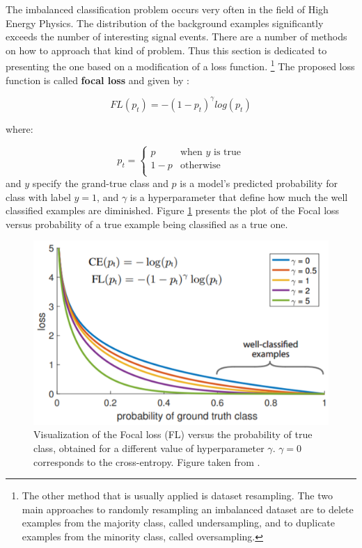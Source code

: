 The imbalanced classification problem occurs very often in the field of High Energy Physics. The distribution of the background examples significantly exceeds the number of interesting signal events. There are a number of methods on how to approach that kind of problem. Thus this section is dedicated to presenting the one based on a modification of a loss function. \footnote{The other method that is usually applied is dataset resampling.  The two main approaches to randomly resampling an imbalanced dataset are to delete examples from the majority class, called undersampling, and to duplicate examples from the minority class, called oversampling.}  The proposed loss function is called \textbf{focal loss} and given by \cite{focal_loss}: 

\begin{equation}
FL(p_t) = -(1-p_t)^{\gamma}log(p_t)
\end{equation}

where:

\begin{equation}
    p_t = \left\{ \begin{array}{ll}
p & \textrm{when $y$ is true}\\
1-p & \textrm{otherwise}\\
\end{array} \right.
\end{equation}
and $y$ specify the grand-true class and $p$ is a model's predicted probability for class with label $y=1$, and $\gamma$ is a hyperparameter that define how much the well classified examples are diminished.  Figure \ref{fig:Focal loss} presents the plot of the Focal loss versus probability of a true example being classified as a true one.

 \begin{figure}[!h]
\centering
\includegraphics{figures/Focal_loss.png}
\caption{Visualization of the Focal loss (FL) versus the probability of true class, obtained for a different value of hyperparameter $\gamma$. $\gamma=0$ corresponds to the cross-entropy. Figure taken from \cite{focal_loss}. 
\label{fig:Focal loss}}
\end{figure}



